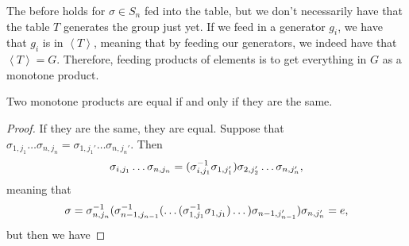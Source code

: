 \noindent The before holds for $\sigma \in S_n$ fed into the table, but we don't necessarily have that the table $T$ generates the group just yet. If we feed in a generator $g_i$, we have that $g_i$ is in $\left<T\right>$, meaning that by feeding our generators, we indeed have that $\left<T\right> = G$. Therefore, feeding products of elements is to get everything in $G$ as a monotone product.
\begin{lemma}
    Two monotone products are equal if and only if they are the same.
\end{lemma}
\begin{proof}
    If they are the same, they are equal. Suppose that $\sigma_{1,j_1} \dots \sigma_{n,j_n} = \sigma_{1,j_1'} \dots \sigma_{n,j_n'}$. Then
    \[ \sigma_{i,j_1} \dots \sigma_{n,j_n} = (\sigma_{i,j_1}^{-1} \sigma_{1,j_1'}) \sigma_{2,j_2'} \dots \sigma_{n,j_n'}, \]
    meaning that
    \[ \sigma = \sigma_{n,j_n}^{-1} (\sigma_{n-1,j_{n-1}}^{-1} (\dots(\sigma_{1,j_1}^{-1} \sigma_{1,j_1})\dots)\sigma_{n-1,j_{n-1}'})\sigma_{n,j_n'} = e, \]
    but then we have
\end{proof}